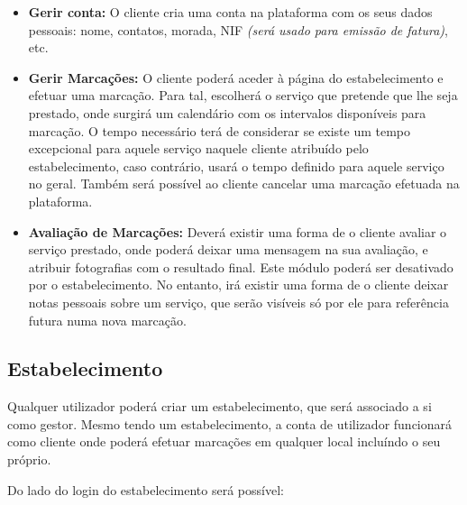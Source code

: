 \documentclass[12pt]{article}
\begin{document}
	\begin{itemize}
		\item \textbf{Gerir conta:} O cliente cria uma conta na plataforma com os seus dados pessoais:
			nome, contatos, morada, NIF \textit{(será usado para emissão de fatura)}, etc.
		\item \textbf{Gerir Marcações:} O cliente poderá aceder à página do estabelecimento e efetuar uma
			marcação. Para tal, escolherá o serviço que pretende que lhe seja prestado, onde surgirá
			um calendário com os intervalos disponíveis para marcação. O tempo necessário terá de considerar 
			se existe um tempo excepcional para aquele serviço naquele cliente atribuído pelo estabelecimento, 
			caso contrário, usará o tempo definido para aquele serviço no geral. Também será possível ao cliente
			cancelar uma marcação efetuada na plataforma.
		\item \textbf{Avaliação de Marcações:} Deverá existir uma forma de o cliente avaliar o serviço prestado,
			onde poderá deixar uma mensagem na sua avaliação, e atribuir fotografias com o resultado final. Este
			módulo poderá ser desativado por o estabelecimento. No entanto, irá existir uma forma de o cliente
			deixar notas pessoais sobre um serviço, que serão visíveis só por ele para referência futura numa
			nova marcação.
	\end{itemize}

	\subsection{Estabelecimento}

	Qualquer utilizador poderá criar um estabelecimento, que será associado a si como gestor. Mesmo tendo um 
	estabelecimento, a conta de utilizador funcionará como cliente onde poderá efetuar marcações em qualquer
	local incluíndo o seu próprio.

	Do lado do login do estabelecimento será possível:
\end{document}
